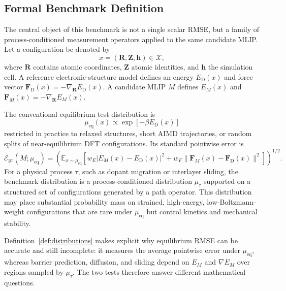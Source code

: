 
\subsection{Formal Benchmark Definition}
\label{sec:benchmark_formalization}

The central object of this benchmark is not a single scalar RMSE, but a family of process-conditioned measurement operators applied to the same candidate MLIP. Let a configuration be denoted by
\[
    x=(\mathbf R,\mathbf Z,\mathbf h)\in\mathcal X,
\]
where $\mathbf R$ contains atomic coordinates, $\mathbf Z$ atomic identities, and $\mathbf h$ the simulation cell. A reference electronic-structure model defines an energy $E_{\mathrm D}(x)$ and force vector $\mathbf F_{\mathrm D}(x)=-\nabla_{\mathbf R}E_{\mathrm D}(x)$. A candidate MLIP $M$ defines $E_M(x)$ and $\mathbf F_M(x)=-\nabla_{\mathbf R}E_M(x)$.

\begin{definition}
\label{def:distributions}
The conventional equilibrium test distribution is
\[
    \mu_{\mathrm{eq}}(x)
    \propto
    \exp[-\beta E_{\mathrm D}(x)]
\]
restricted in practice to relaxed structures, short AIMD trajectories, or random splits of near-equilibrium DFT configurations. Its standard pointwise error is
\[
    \mathcal E_{\mathrm{pt}}(M;\mu_{\mathrm{eq}})
    =
    \left(\mathbb E_{x\sim\mu_{\mathrm{eq}}}
    \left[
    w_E |E_M(x)-E_{\mathrm D}(x)|^2
    +
    w_F \|\mathbf F_M(x)-\mathbf F_{\mathrm D}(x)\|^2
    \right]\right)^{1/2}.
\]
For a physical process $\tau$, such as dopant migration or interlayer sliding, the benchmark distribution is a process-conditioned distribution $\mu_\tau$ supported on a structured set of configurations generated by a path operator. This distribution may place substantial probability mass on strained, high-energy, low-Boltzmann-weight configurations that are rare under $\mu_{\mathrm{eq}}$ but control kinetics and mechanical stability.
\end{definition}

Definition~\ref{def:distributions} makes explicit why equilibrium RMSE can be accurate and still incomplete: it measures the average pointwise error under $\mu_{\mathrm{eq}}$, whereas barrier prediction, diffusion, and sliding depend on $E_M$ and $\nabla E_M$ over regions sampled by $\mu_\tau$. The two tests therefore answer different mathematical questions.

